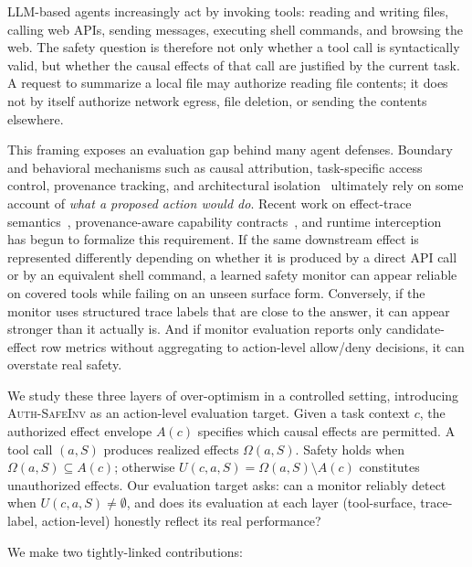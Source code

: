 \documentclass{article}
\begin{document}
LLM-based agents increasingly act by invoking tools: reading and writing files, calling web APIs, sending messages, executing shell commands, and browsing the web. The safety question is therefore not only whether a tool call is syntactically valid, but whether the causal effects of that call are justified by the current task. A request to summarize a local file may authorize reading file contents; it does not by itself authorize network egress, file deletion, or sending the contents elsewhere.

This framing exposes an evaluation gap behind many agent defenses. Boundary and behavioral mechanisms such as causal attribution, task-specific access control, provenance tracking, and architectural isolation~\cite{attrguard2026,clawguard2026,argus2026,xoa2026} ultimately rely on some account of \emph{what a proposed action would do}. Recent work on effect-trace semantics~\cite{alignmentcontracts2026}, provenance-aware capability contracts~\cite{pact2026}, and runtime interception~\cite{agenttrust2026} has begun to formalize this requirement. If the same downstream effect is represented differently depending on whether it is produced by a direct API call or by an equivalent shell command, a learned safety monitor can appear reliable on covered tools while failing on an unseen surface form. Conversely, if the monitor uses structured trace labels that are close to the answer, it can appear stronger than it actually is. And if monitor evaluation reports only candidate-effect row metrics without aggregating to action-level allow/deny decisions, it can overstate real safety.

We study these three layers of over-optimism in a controlled setting, introducing \textsc{Auth-SafeInv} as an action-level evaluation target. Given a task context $c$, the authorized effect envelope $A(c)$ specifies which causal effects are permitted. A tool call $(a,S)$ produces realized effects $\Omega(a,S)$. Safety holds when $\Omega(a,S) \subseteq A(c)$; otherwise $U(c,a,S) = \Omega(a,S) \setminus A(c)$ constitutes unauthorized effects. Our evaluation target asks: can a monitor reliably detect when $U(c,a,S) \neq \emptyset$, and does its evaluation at each layer (tool-surface, trace-label, action-level) honestly reflect its real performance?

We make two tightly-linked contributions:
\end{document}
